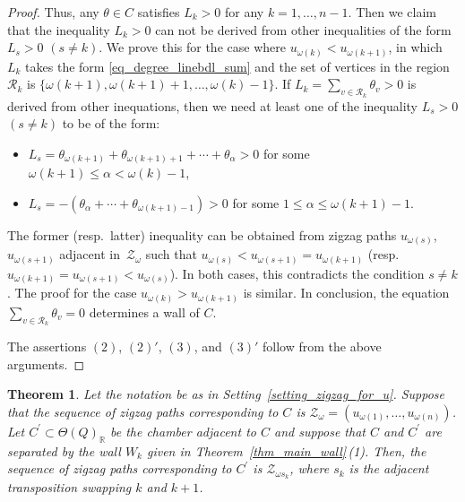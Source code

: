 \documentclass[10pt,a4paper]{amsart}
\numberwithin{equation}{section}
\newtheorem{Theorem}{Theorem}[section]
\theoremstyle{definition}
\newcommand{\RR}{\mathbb{R}}
\newcommand{\calR}{\mathcal{R}}
\newcommand{\calZ}{\mathcal{Z}}
\newcommand{\permII}{\omega}
\begin{document}
\begin{proof}
Thus, any $\theta\in C$ satisfies $L_k>0$ for any $k=1, \dots, n-1$.
Then we claim that the inequality $L_k>0$ can not be derived from other inequalities of the form $L_s>0$ $(s\neq k)$.
We prove this for the case where $u_{\permII(k)}<u_{\permII(k+1)}$, in which $L_k$ takes the form \eqref{eq_degree_linebdl_sum} and the set of vertices in the region $\calR_k$ is
$\{\permII(k+1), \permII(k+1)+1, \dots, \permII(k)-1\}$.
If $L_k=\sum_{v\in\calR_k}\theta_v>0$ is derived from other inequations, then we need at least one of the inequality $L_s>0$ $(s\neq k)$ to be of the form:
\begin{itemize}\itemsep=0pt
\item $L_s=\theta_{\permII(k+1)}+\theta_{\permII(k+1)+1}+\cdots+\theta_\alpha>0$ for some $\permII(k+1)\le \alpha<\permII(k)-1$,
\item $L_s=-(\theta_\alpha+\cdots+\theta_{\permII(k+1)-1})>0$ for some $1\leq \alpha\leq \permII(k+1)-1$.
\end{itemize}
The former (resp.\ latter) inequality can be obtained from zigzag paths $u_{\permII(s)}$, $u_{\permII(s+1)}$ adjacent in~$\calZ_\permII$ such that
$u_{\permII(s)}<u_{\permII(s+1)}=u_{\permII(k+1)}$ (resp.\ $u_{\permII(k+1)}=u_{\permII(s+1)}<u_{\permII(s)}$).
In both cases, this contradicts the condition $s\neq k$. The proof for the case $u_{\permII(k)}>u_{\permII(k+1)}$ is similar.
In conclusion, the equation $\sum_{v\in\calR_k}\theta_v=0$ determines a wall of $C$.

The assertions $(2)$, $(2)'$, $(3)$, and $(3)'$ follow from the above arguments.
\end{proof}

\begin{Theorem}\label{thm_adjacentchamber_reflection}
Let the notation be as in Setting~{\rm \ref{setting_zigzag_for_u}}.
Suppose that the sequence of zigzag paths corresponding to $C$ is $\calZ_\permII=(u_{\permII(1)}, \dots, u_{\permII(n)})$.
Let $C^\prime\subset \Theta(Q)_\RR$ be the chamber adjacent to $C$ and suppose that $C$ and $C^\prime$ are separated by the wall $W_k$ given in Theorem~{\rm \ref{thm_main_wall}\,(1)}.
Then, the sequence of zigzag paths corresponding to $C^\prime$ is $\calZ_{\permII s_k}$, where $s_k$ is the adjacent transposition swapping $k$ and $k+1$.
\end{Theorem}
\end{document}
